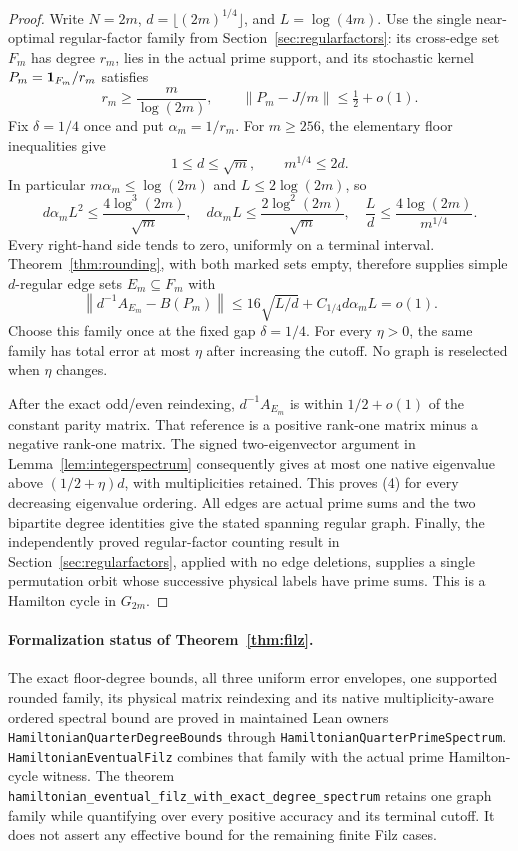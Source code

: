 \documentclass[11pt]{article}
\theoremstyle{remark}
\begin{document}
\begin{proof}
Write \(N=2m\), \(d=\lfloor(2m)^{1/4}\rfloor\), and
\(L=\log(4m)\). Use the single near-optimal regular-factor family
from Section~\ref{sec:regularfactors}: its cross-edge set \(F_m\)
has degree \(r_m\), lies in the actual prime support, and its
stochastic kernel \(P_m={\bf1}_{F_m}/r_m\) satisfies
\[
 r_m\geq\frac{m}{\log(2m)},\qquad
 \|P_m-J/m\|\leq\tfrac12+o(1).
\]
Fix \(\delta=1/4\) once and put \(\alpha_m=1/r_m\).
For \(m\geq256\), the elementary floor inequalities give
\[
 1\leq d\leq\sqrt m,\qquad m^{1/4}\leq2d.
\]
In particular \(m\alpha_m\leq\log(2m)\) and \(L\leq2\log(2m)\), so
\[
 d\alpha_mL^2\leq\frac{4\log^3(2m)}{\sqrt m},\quad
 d\alpha_mL\leq\frac{2\log^2(2m)}{\sqrt m},\quad
 \frac Ld\leq\frac{4\log(2m)}{m^{1/4}}.
\]
Every right-hand side tends to zero, uniformly on a terminal
interval. Theorem~\ref{thm:rounding}, with both marked sets empty,
therefore supplies simple \(d\)-regular edge sets \(E_m\subseteq F_m\)
with
\[
 \left\|d^{-1}A_{E_m}-B(P_m)\right\|
 \leq16\sqrt{L/d}+C_{1/4}d\alpha_mL=o(1).
\]
Choose this family once at the fixed gap \(\delta=1/4\).
For every \(\eta>0\), the same family has total error at most
\(\eta\) after increasing the cutoff. No graph is reselected when
\(\eta\) changes.

After the exact odd/even reindexing, \(d^{-1}A_{E_m}\) is within
\(1/2+o(1)\) of the constant parity matrix. That reference is a
positive rank-one matrix minus a negative rank-one matrix.
The signed two-eigenvector argument in
Lemma~\ref{lem:integerspectrum} consequently gives at most one
native eigenvalue above \((1/2+\eta)d\), with multiplicities
retained. This proves (4) for every decreasing eigenvalue ordering.
All edges are actual prime sums and the two bipartite degree
identities give the stated spanning regular graph.
Finally, the independently proved regular-factor counting result
in Section~\ref{sec:regularfactors}, applied with no edge deletions,
supplies a single permutation orbit whose successive physical
labels have prime sums. This is a Hamilton cycle in \(G_{2m}\).
\end{proof}

\paragraph{Formalization status of Theorem~\ref{thm:filz}.}
The exact floor-degree bounds, all three uniform error envelopes,
one supported rounded family, its physical matrix reindexing and
its native multiplicity-aware ordered spectral bound are proved
in maintained Lean owners
\texttt{HamiltonianQuarterDegreeBounds} through
\texttt{HamiltonianQuarterPrimeSpectrum}.
\texttt{HamiltonianEventualFilz} combines that family with the
actual prime Hamilton-cycle witness. The theorem
\texttt{hamiltonian\_eventual\_filz\_with\_exact\_degree\_spectrum}
retains one graph family while quantifying over every positive
accuracy and its terminal cutoff. It does not assert any
effective bound for the remaining finite Filz cases.
\end{document}
